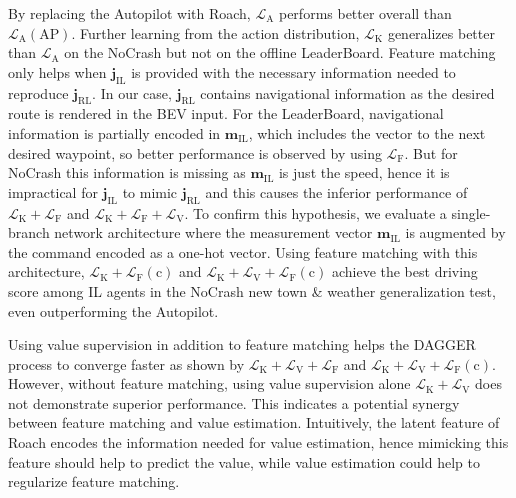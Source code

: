 By replacing the Autopilot with Roach, $\mathcal{L}_\text{A}$ performs better overall than $\mathcal{L}_\text{A}(\text{AP})$.
Further learning from the action distribution, $\mathcal{L}_\text{K}$ generalizes better than $\mathcal{L}_\text{A}$ on the NoCrash but not on the offline LeaderBoard.
Feature matching only helps when $\mathbf{j}_\text{IL}$ is provided with the necessary information needed to reproduce $\mathbf{j}_\text{RL}$.
In our case, $\mathbf{j}_\text{RL}$ contains navigational information as the desired route is rendered in the BEV input.
For the LeaderBoard, navigational information is partially encoded in $\mathbf{m}_\text{IL}$, which includes the vector to the next desired waypoint, so better performance is observed by using $\mathcal{L}_\text{F}$.
But for NoCrash this information is missing as $\mathbf{m}_\text{IL}$ is just the speed, hence it is impractical for $\mathbf{j}_\text{IL}$ to mimic $\mathbf{j}_\text{RL}$ and this causes the inferior performance of $\mathcal{L}_\text{K}+\mathcal{L}_\text{F}$ and $\mathcal{L}_\text{K}+\mathcal{L}_\text{F}+\mathcal{L}_\text{V}$.
To confirm this hypothesis, we evaluate a single-branch network architecture where the measurement vector $\mathbf{m}_\text{IL}$ is augmented by the command encoded as a one-hot vector.
Using feature matching with this architecture, $\mathcal{L}_\text{K}+\mathcal{L}_\text{F}(\text{c})$ and $\mathcal{L}_\text{K}+\mathcal{L}_\text{V}+\mathcal{L}_\text{F}(\text{c})$ achieve the best driving score among IL agents in the NoCrash new town \& weather generalization test, even outperforming the Autopilot.

Using value supervision in addition to feature matching helps the DAGGER process to converge faster as shown by $\mathcal{L}_\text{K}+\mathcal{L}_\text{V}+\mathcal{L}_\text{F}$ and $\mathcal{L}_\text{K}+\mathcal{L}_\text{V}+\mathcal{L}_\text{F}(\text{c})$.
However, without feature matching, using value supervision alone $\mathcal{L}_\text{K}+\mathcal{L}_\text{V}$ does not demonstrate superior performance.
This indicates a potential synergy between feature matching and value estimation.
Intuitively, the latent feature of Roach encodes the information needed for value estimation, hence mimicking this feature should help to predict the value,
while value estimation could help to regularize feature matching.


